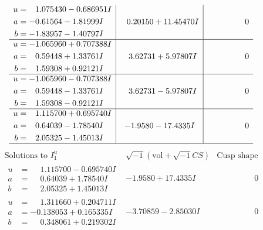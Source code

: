 \documentclass[1p]{elsarticle_modified}
\theoremstyle{definition}
\newcommand{\I}{\sqrt{-1}}
\begin{document}
$$\begin{array}{c|c|c}
\begin{aligned}
u &= \phantom{-}1.075430 - 0.686951 I \\
a &= -0.61564 - 1.81999 I \\
b &= -1.83957 - 1.40797 I\end{aligned}
 & \phantom{-}0.20150 + 11.45470 I & \phantom{-0.000000 } 0 \\ \hline\begin{aligned}
u &= -1.065960 + 0.707388 I \\
a &= \phantom{-}0.59448 + 1.33761 I \\
b &= \phantom{-}1.59308 + 0.92121 I\end{aligned}
 & \phantom{-}3.62731 + 5.97807 I & \phantom{-0.000000 } 0 \\ \hline\begin{aligned}
u &= -1.065960 - 0.707388 I \\
a &= \phantom{-}0.59448 - 1.33761 I \\
b &= \phantom{-}1.59308 - 0.92121 I\end{aligned}
 & \phantom{-}3.62731 - 5.97807 I & \phantom{-0.000000 } 0 \\ \hline\begin{aligned}
u &= \phantom{-}1.115700 + 0.695740 I \\
a &= \phantom{-}0.64039 - 1.78540 I \\
b &= \phantom{-}2.05325 - 1.45013 I\end{aligned}
 & -1.9580 - 17.4335 I & \phantom{-0.000000 } 0\\
 \hline 
 \end{array}$$\newpage$$\begin{array}{c|c|c}  
\text{Solutions to }I^u_{1}& \I (\text{vol} + \sqrt{-1}CS) & \text{Cusp shape}\\
 \hline 
\begin{aligned}
u &= \phantom{-}1.115700 - 0.695740 I \\
a &= \phantom{-}0.64039 + 1.78540 I \\
b &= \phantom{-}2.05325 + 1.45013 I\end{aligned}
 & -1.9580 + 17.4335 I & \phantom{-0.000000 } 0 \\ \hline\begin{aligned}
u &= \phantom{-}1.311660 + 0.204711 I \\
a &= -0.138053 + 0.165335 I \\
b &= \phantom{-}0.348061 + 0.219302 I\end{aligned}
 & -3.70859 - 2.85030 I & \phantom{-0.000000 } 0 \\ \hline\begin{aligned}

\end{aligned}
\end{array}$$
\end{document}
